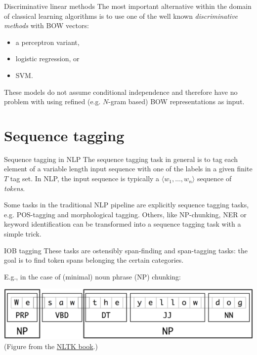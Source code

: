 \documentclass[style=upen, size=14pt]{powerdot}
\theoremstyle{definition}
\begin{document}
 \begin{slide}[toc=Discriminative]{Discriminative linear methods}
   The most important alternative within the domain of classical learning
   algorithms is to use one of the well known \emph{discriminative methods} with
   BOW vectors:
   \begin{itemize}
   \item a perceptron variant,
   \item logistic regression, or  
   \item SVM.
   \end{itemize}
   These models do not assume conditional independence and therefore have no
   problem with using refined (e.g. $N$-gram based) BOW representations as input.
 \end{slide}

 \section{Sequence tagging}

 \begin{slide}[toc=Tagging tasks in NLP]{Sequence tagging in NLP}
   The sequence tagging task in general is to tag each element of a variable
   length input sequence with one of the labels in a given finite $T$ tag set.
   In NLP, the input sequence is typically a $\langle w_1,\dots,w_n \rangle$
   sequence of \emph{tokens}.\bigskip

   Some tasks in the traditional NLP pipeline are explicitly sequence tagging
   tasks, e.g. POS-tagging and morphological tagging. Others, like NP-chunking,
   NER or keyword identification can be transformed into a sequence tagging task
   with a simple trick.
 \end{slide}

 \begin{slide}[toc=IOB tagging]{IOB tagging}
   These tasks are ostensibly span-finding and span-tagging tasks: the goal is
   to find token spans belonging the certain categories.

   E.g., in the case of (minimal) noun phrase (NP) chunking:
   \begin{center}
     \includegraphics[width=1.0\textwidth]{figures/iob1.eps}
   \footnotesize(Figure from the \href{http://www.nltk.org/book/ch07.html}{NLTK book}.)
 \end{center}
 \end{slide}
\end{document}
